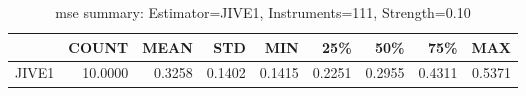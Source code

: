 \begin{table}[ht]
\centering
\caption{mse summary: Estimator=JIVE1, Instruments=111, Strength=0.10}
\begin{tabular}{lrrrrrrrr}
\toprule
 & COUNT & MEAN & STD & MIN & 25\% & 50\% & 75\% & MAX \\
\midrule
JIVE1 & 10.0000 & 0.3258 & 0.1402 & 0.1415 & 0.2251 & 0.2955 & 0.4311 & 0.5371 \\
\bottomrule
\end{tabular}
\end{table}
